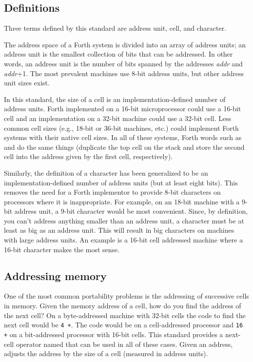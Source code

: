 \subsection{Definitions} %

Three terms defined by this standard are address unit, cell, and
character.

The address space of a Forth system is divided into an array of
address units; an address unit is the smallest collection of bits that
can be addressed. In other words, an address unit is the number of
bits spanned by the addresses \emph{addr} and \emph{addr}+1.
The most prevalent machines use 8-bit address units, but other
address unit sizes exist.

In this standard, the size of a cell is an implementation-defined
number of address units. Forth implemented on a 16-bit microprocessor
could use a 16-bit cell and an implementation on a 32-bit machine
could use a 32-bit cell. Less common cell sizes (e.g., 18-bit or
36-bit machines, etc.) could implement Forth systems with their native
cell sizes. In all of these systems, Forth words such as  and
\word{!}  do the same things (duplicate the top cell on the stack
and store the second cell into the address given by the first cell,
respectively).

Similarly, the definition of a character has been generalized to be
an implementation-defined number of address units (but at least eight
bits). This removes the need for a Forth implementor to provide 8-bit
characters on processors where it is inappropriate. For example, on
an 18-bit machine with a 9-bit address unit, a 9-bit character would
be most convenient. Since, by definition, you can't address anything
smaller than an address unit, a character must be at least as big as
an address unit. This will result in big characters on machines with
large address units. An example is a 16-bit cell addressed machine
where a 16-bit character makes the most sense.

\subsection{Addressing memory} %

One of the most common portability problems is the addressing of 
successive cells in memory. Given the memory address of a cell, how
do you find the address of the next cell? 
On a byte-addressed machine
with 32-bit cells the code to find the next cell would be \texttt{4 +}.
The code would be  on a cell-addressed processor and
\texttt{16 +} on a bit-addressed processor with 16-bit cells.
This standard provides a
next-cell operator named  that can be used in all of these cases.
Given an address,  adjusts the address by the size of a cell
(measured in address units).

